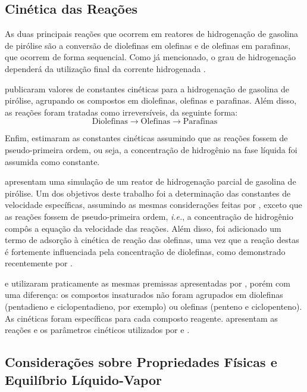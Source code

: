 \subsection{Cinética das Reações} \label{sec:cinetica}

As duas principais reações que ocorrem em reatores de hidrogenação de gasolina
de pirólise são a conversão de diolefinas em olefinas e de olefinas em
parafinas, que ocorrem de forma sequencial. Como já mencionado, o grau de
hidrogenação dependerá da utilização final da corrente hidrogenada
\cite{Cheng1986}.

 publicaram valores de constantes cinéticas para a
hidrogenação de gasolina de pirólise, agrupando os compostos em diolefinas,
olefinas e parafinas. Além disso, as reações foram tratadas como irreversíveis,
da seguinte forma:
\begin{equation}
\textrm{Diolefinas} \rightarrow \textrm{Olefinas} \rightarrow \textrm{Parafinas}
\label{eq:hidrogenacao}
\end{equation}

Enfim,  estimaram as constantes cinéticas assumindo que
as reações fossem de pseudo-primeira ordem, ou seja, a concentração de
hidrogênio na fase líquida foi assumida como constante.

 apresentam uma simulação de um reator de
hidrogenação parcial de gasolina de pirólise. Um dos objetivos deste trabalho
foi a determinação das constantes de velocidade específicas, assumindo as
mesmas considerações feitas por , exceto que as
reações fossem de pseudo-primeira ordem, \emph{i.e.}, a concentração de
hidrogênio compôs a equação da velocidade das reações. Além disso, foi
adicionado um termo de adsorção à cinética de reação das olefinas, uma vez que a
reação destas é fortemente influenciada pela concentração de diolefinas, como
demonstrado recentemente por .

 e  utilizaram praticamente as
mesmas premissas apresentadas por , porém com uma
diferença: os compostos insaturados não foram agrupados em diolefinas
(pentadieno e ciclopentadieno, por exemplo) ou olefinas (penteno e
ciclopenteno). As cinéticas foram específicas para cada composto reagente.
 apresentam as reações e os parâmetros cinéticos
utilizados por  e .

\subsection{Considerações sobre Propriedades Físicas e Equilíbrio Líquido-Vapor}
\label{sec:consideracoeselv}

